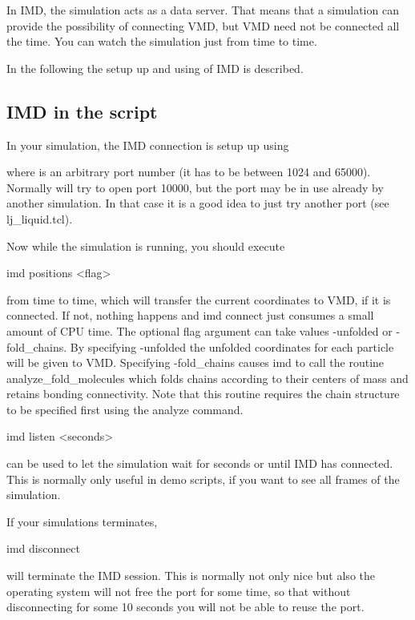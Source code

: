 In IMD, the simulation acts as a data server. That means that a
simulation can provide the possibility of connecting VMD, but VMD need
not be connected all the time. You can watch the simulation just from
time to time.

In the following the setup up and using of IMD is described.

\subsection{IMD in the script}

In your simulation, the IMD connection is setup up using 

where  is an arbitrary port number (it has to be between
1024 and 65000). Normally \es{} will try to open port 10000, but the
port may be in use already by another \es{} simulation. In that case
it is a good idea to just try another port (see lj\_liquid.tcl).

Now while the simulation is running, you should execute
\begin{code}
imd positions <flag>
\end{code}
from time to time, which will transfer the current coordinates to VMD,
if it is connected. If not, nothing happens and imd connect just
consumes a small amount of CPU time. The optional flag argument can
take values -unfolded or -fold\_chains. By specifying -unfolded the
unfolded coordinates for each particle will be given to VMD.
Specifying -fold\_chains causes imd to call the routine
analyze\_fold\_molecules which folds chains according to their centers
of mass and retains bonding connectivity. Note that this routine
requires the chain structure to be specified first using the analyze
command.
\begin{code}
imd listen <seconds>
\end{code}
can be used to let the simulation wait for  seconds or
until IMD has connected. This is normally only useful in demo scripts,
if you want to see all frames of the simulation.

If your simulations terminates,
\begin{code}
imd disconnect
\end{code}

will terminate the IMD session. This is normally not only nice but
also the operating system will not free the port for some time, so
that without disconnecting for some 10 seconds you will not be able to
reuse the port.

